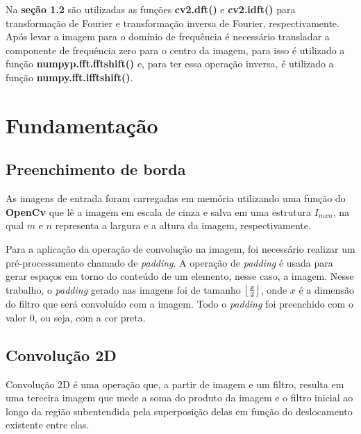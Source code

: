 \documentclass[twoside,twocolumn]{article}
\DeclarePairedDelimiter\floor{\lfloor}{\rfloor}
\begin{document}
Na \textbf{seção 1.2} são utilizadas as funções \textbf{cv2.dft()} e \textbf{cv2.idft()} para transformação de Fourier e transformação inversa de Fourier, respectivamente. Após levar a imagem para o domínio de frequência é necessário transladar a componente de frequência zero para o centro da imagem, para isso é utilizado a função \textbf{numpyp.fft.fftshift()} e, para ter essa operação inversa, é utilizado a função \textbf{numpy.fft.ifftshift()}.


\section{Fundamentação}

\subsection{Preenchimento de borda}

As imagens de entrada foram carregadas em memória utilizando uma função do \textbf{OpenCv} \cite{b1} que lê a imagem em escala de cinza e salva em uma estrutura $I_{m x n}$, na qual $m$ e $n$ representa a largura e a altura da imagem, respectivamente.

Para a aplicação da operação de convolução na imagem, foi necessário realizar um pré-processamento chamado de \textit{padding}. A operação de \textit{padding} é usada para gerar espaços em torno do conteúdo de um elemento, nesse caso, a imagem. Nesse trabalho, o \textit{padding} gerado nas imagens foi de tamanho $\floor*{\frac{x}{2}}$, onde $x$ é a dimensão do filtro que será convoluído com a imagem. Todo o \textit{padding} foi preenchido com o valor $0$, ou seja, com a cor preta.

\subsection{Convolução 2D}

Convolução 2D é uma operação que, a partir de imagem e um filtro, resulta em uma terceira imagem que mede a soma do produto da imagem e o filtro inicial ao longo da região subentendida pela superposição delas em função do deslocamento existente entre elas.
\end{document}
